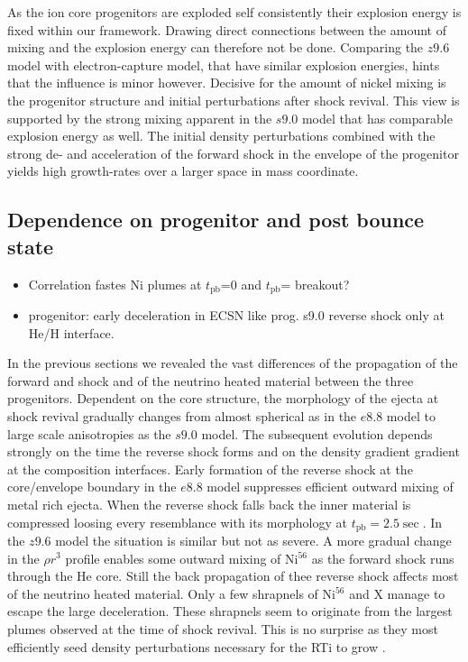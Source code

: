 \documentclass[fleqn,usenatbib]{mnras}
\newcommand{\tpb}{\ensuremath{t_\mathrm{pb}}}
\newcommand{\nickel}{$\mathrm{Ni^{56}}$\xspace}
\newcommand{\tracer}{$\mathrm{X}$\xspace}
\newcommand{\COM}[1]{{\color{red}#1}}
\begin{document}
As the ion core progenitors are exploded self consistently their explosion energy is fixed within our framework. Drawing direct connections between the amount of mixing and the explosion energy can therefore not be done. Comparing the $z9.6$ model with electron-capture model, that have similar explosion energies, hints that the influence is minor however. Decisive for the amount of nickel mixing is the progenitor structure and initial perturbations after shock revival. This view is supported by the strong mixing apparent in the $s9.0$ model that has comparable explosion energy as well. The initial density perturbations combined with the strong de- and acceleration of the forward shock in the envelope of the progenitor yields high growth-rates over a larger space in mass coordinate. 


\subsection{Dependence on progenitor and post bounce state}
\COM{
\begin{itemize}
    \item Correlation fastes Ni plumes at \tpb=0 and \tpb= breakout?
    \item progenitor: early deceleration in ECSN like prog. s9.0 reverse shock only at He/H interface. 
\end{itemize}
}
In the previous sections we revealed the vast differences of the propagation of the forward and shock and of the neutrino heated material between the three progenitors. 
Dependent on the core structure, the morphology of the ejecta at shock revival gradually changes from  almost spherical as in the $e8.8$ model to large scale anisotropies as the $s9.0$ model.
The subsequent evolution depends strongly on the time the reverse shock forms and on the density gradient gradient at the composition interfaces.
Early formation of the reverse shock at the core/envelope boundary in the $e8.8$ model suppresses efficient outward mixing of metal rich ejecta. When the reverse shock falls back the inner material is compressed loosing every resemblance with its morphology at $\tpb=2.5\sec$.
In the $z9.6$ model the situation is similar but not as severe. A more gradual change in the $\rho r^3$ profile enables some outward mixing of \nickel as the forward shock runs through the He core. Still the back propagation of thee reverse shock affects most of the neutrino heated material. Only a few shrapnels of \nickel and \tracer manage to escape the large deceleration. These shrapnels seem to originate from the largest plumes observed at the time of shock revival. This is no surprise as they most efficiently seed density perturbations necessary for the RTi to grow \citep{Wongwathanarat2015}.
\end{document}
